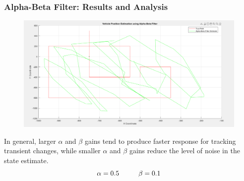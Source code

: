 \documentclass{beamer}
\begin{document}
\begin{frame}
\frametitle{Alpha-Beta Filter: Results and Analysis}
\begin{figure}
\includegraphics[width=0.65\linewidth]{alpha_beta.png}
\end{figure}
In general, larger $\alpha$ and $\beta$ gains tend to produce faster response for tracking transient changes, while smaller
$\alpha$ and $\beta$ gains reduce the level of noise in the state estimate.
\begin{equation*}
    \alpha = 0.5 \hspace*{1cm} \beta = 0.1
\end{equation*}
\end{frame}
\end{document}
